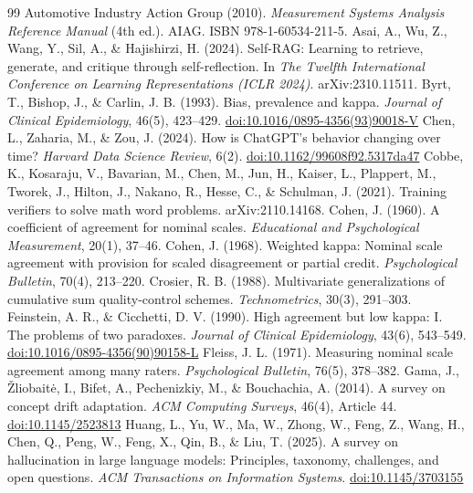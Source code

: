\documentclass[11pt]{article}
\newcommand{\doi}[1]{\href{https://doi.org/#1}{doi:#1}}
\begin{document}
\begin{thebibliography}{99}\small
{} Automotive Industry Action Group (2010). \emph{Measurement Systems Analysis Reference Manual} (4th ed.). AIAG. ISBN 978-1-60534-211-5.
 Asai, A., Wu, Z., Wang, Y., Sil, A., \& Hajishirzi, H. (2024). Self-RAG: Learning to retrieve, generate, and critique through self-reflection. In \emph{The Twelfth International Conference on Learning Representations (ICLR 2024)}. arXiv:2310.11511.
 Byrt, T., Bishop, J., \& Carlin, J. B. (1993). Bias, prevalence and kappa. \emph{Journal of Clinical Epidemiology}, 46(5), 423--429. \doi{10.1016/0895-4356(93)90018-V}
 Chen, L., Zaharia, M., \& Zou, J. (2024). How is ChatGPT's behavior changing over time? \emph{Harvard Data Science Review}, 6(2). \doi{10.1162/99608f92.5317da47}
 Cobbe, K., Kosaraju, V., Bavarian, M., Chen, M., Jun, H., Kaiser, L., Plappert, M., Tworek, J., Hilton, J., Nakano, R., Hesse, C., \& Schulman, J. (2021). Training verifiers to solve math word problems. arXiv:2110.14168.
 Cohen, J. (1960). A coefficient of agreement for nominal scales. \emph{Educational and Psychological Measurement}, 20(1), 37--46.
 Cohen, J. (1968). Weighted kappa: Nominal scale agreement with provision for scaled disagreement or partial credit. \emph{Psychological Bulletin}, 70(4), 213--220.
 Crosier, R. B. (1988). Multivariate generalizations of cumulative sum quality-control schemes. \emph{Technometrics}, 30(3), 291--303.
 Feinstein, A. R., \& Cicchetti, D. V. (1990). High agreement but low kappa: I. The problems of two paradoxes. \emph{Journal of Clinical Epidemiology}, 43(6), 543--549. \doi{10.1016/0895-4356(90)90158-L}
 Fleiss, J. L. (1971). Measuring nominal scale agreement among many raters. \emph{Psychological Bulletin}, 76(5), 378--382.
 Gama, J., \v{Z}liobait\.{e}, I., Bifet, A., Pechenizkiy, M., \& Bouchachia, A. (2014). A survey on concept drift adaptation. \emph{ACM Computing Surveys}, 46(4), Article 44. \doi{10.1145/2523813}
 Huang, L., Yu, W., Ma, W., Zhong, W., Feng, Z., Wang, H., Chen, Q., Peng, W., Feng, X., Qin, B., \& Liu, T. (2025). A survey on hallucination in large language models: Principles, taxonomy, challenges, and open questions. \emph{ACM Transactions on Information Systems}. \doi{10.1145/3703155}

\end{thebibliography}
\end{document}
